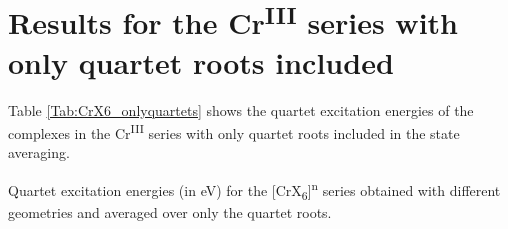 \section{Results for the Cr\textsuperscript{III} series with only quartet roots included}
\label{Sec:appendix_CrIII_quartetaveraging}
Table \ref{Tab:CrX6_onlyquartets} shows the quartet excitation energies of the complexes in the Cr\textsuperscript{III} series with only quartet roots included in the state averaging.
\begin{table}
\small
\centering
\ttabbox
{\caption[Quartet excitation energies for the {[CrX\textsubscript{6}]}\textsuperscript{n} series averaged over only the quartet roots.]{Quartet excitation energies (in eV) for the [CrX\textsubscript{6}]\textsuperscript{n} series obtained with different geometries and averaged over only the quartet roots.}
\label{Tab:CrX6_onlyquartets}}
{
}
\end{table}

